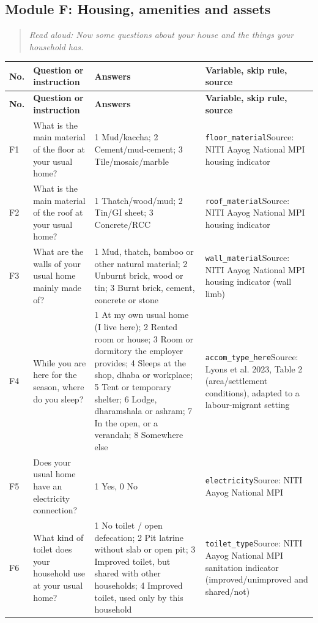 \documentclass[10pt]{article}
\begin{document}
\subsection*{Module F: Housing, amenities and assets}
\begin{quote}\small\textit{Read aloud: Now some questions about your house and the things your household has.}\end{quote}
{\scriptsize
\begin{longtable}{p{0.8cm}p{6.4cm}p{3.6cm}p{5.8cm}}
\toprule
\textbf{No.} & \textbf{Question or instruction} & \textbf{Answers} & \textbf{Variable, skip rule, source} \\
\midrule
\endfirsthead
\toprule
\textbf{No.} & \textbf{Question or instruction} & \textbf{Answers} & \textbf{Variable, skip rule, source} \\
\midrule
\endhead
F1 & What is the main material of the floor at your usual home? & 1 Mud/kaccha; 2 Cement/mud-cement; 3 Tile/mosaic/marble & \texttt{floor\_material}\newline Source: NITI Aayog National MPI housing indicator \\
F2 & What is the main material of the roof at your usual home? & 1 Thatch/wood/mud; 2 Tin/GI sheet; 3 Concrete/RCC & \texttt{roof\_material}\newline Source: NITI Aayog National MPI housing indicator \\
F3 & What are the walls of your usual home mainly made of? & 1 Mud, thatch, bamboo or other natural material; 2 Unburnt brick, wood or tin; 3 Burnt brick, cement, concrete or stone & \texttt{wall\_material}\newline Source: NITI Aayog National MPI housing indicator (wall limb) \\
F4 & While you are here for the season, where do you sleep? & 1 At my own usual home (I live here); 2 Rented room or house; 3 Room or dormitory the employer provides; 4 Sleeps at the shop, dhaba or workplace; 5 Tent or temporary shelter; 6 Lodge, dharamshala or ashram; 7 In the open, or a verandah; 8 Somewhere else & \texttt{accom\_type\_here}\newline Source: Lyons et al. 2023, Table 2 (area/settlement conditions), adapted to a labour-migrant setting \\
F5 & Does your usual home have an electricity connection? & 1 Yes, 0 No & \texttt{electricity}\newline Source: NITI Aayog National MPI \\
F6 & What kind of toilet does your household use at your usual home? & 1 No toilet / open defecation; 2 Pit latrine without slab or open pit; 3 Improved toilet, but shared with other households; 4 Improved toilet, used only by this household & \texttt{toilet\_type}\newline Source: NITI Aayog National MPI sanitation indicator (improved/unimproved and shared/not) \\

\end{longtable}}
\end{document}
